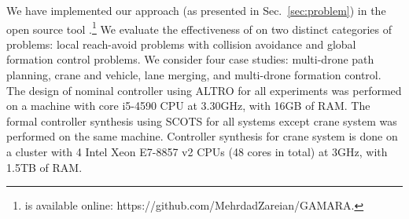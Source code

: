 We have implemented our approach (as presented in Sec.~\ref{sec:problem}) in the open source tool \tool.\footnote{
	\tool is available online: https://github.com/MehrdadZareian/GAMARA.
}
We evaluate the effectiveness of \tool on two distinct categories of problems: 
local reach-avoid problems with collision avoidance and global formation control problems. 
We consider four case studies: multi-drone path planning, crane and vehicle, lane merging, and multi-drone formation control. 
The design of nominal controller using ALTRO for all experiments was performed on a machine with core i5-4590 CPU at 3.30GHz, with 16GB of RAM.
The formal controller synthesis using SCOTS for all systems except crane system was performed on the same machine. Controller synthesis for crane system is done on a cluster with 4 Intel Xeon E7-8857 v2 CPUs (48 cores in total) at 3GHz, with 1.5TB of RAM. 

